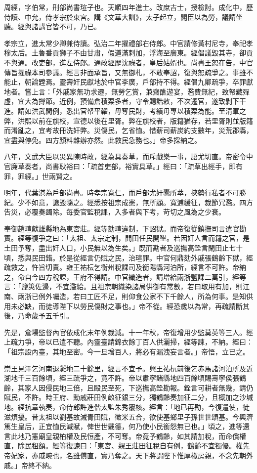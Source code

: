 \begin{pinyinscope}
周經，字伯常，刑部尚書瑄子也。天順四年進士。改庶吉士，授檢討。成化中，歷侍讀、中允，侍孝宗於東宮。講《文華大訓》，太子起立，閣臣以為勞，議請坐聽。經與諸講官皆不可，乃已。

孝宗立，進太常少卿兼侍讀。弘治二年擢禮部右侍郎。中官請修黃村尼寺，奉祀孝穆太后。土魯番貢獅子不由甘肅，假道滿剌加，浮海至廣東。經倡議毀其寺，卻貢不與通。改吏部，進左侍郎。通政經歷沈祿者，皇后姑婿也。尚書王恕在告，中官傳旨擢祿本司參議。經言非面承旨，又無御札，不敢奉詔，復與恕疏爭之。事雖不能止，朝論韙焉。靈壽奸民獻地於中官李廣，戶部持不得。經倡九卿疏爭，卒罪獻地者。嘗上言：「外戚家無功求遷，無勞乞賞，兼齋醮遊宴，濫費無紀，致帑藏殫虛，宜大為撙節。近例，預備倉積粟多者，守令賜誥敕，不次遷官，遂致剝下干進。請如洪武間例，悉出官帑平糴，毋奪民財，考績毋專以積粟為能。至清軍之弊，洪熙以前在旗校，宣德以後在里胥。弊在旗校者，版籍猶存，若里胥則並版籍而淆亂之，宜考故冊洗奸弊。災傷民，乞省恤。惜薪司薪炭約支數年，災荒郡縣，宜盡與停免。四方顏料雜辦亦然。此救民急務也。」帝多採納之。

八年，文武大臣以災異陳時政，經為具奏草，而斥戲樂一事，語尤切直。帝密令中官廉草奏者，尚書耿裕曰：「疏首吏部，裕實具草。」經曰：「疏草出經手，即有罪，罪經。」世兩賢之。

明年，代葉淇為戶部尚書。時孝宗寬仁，而戶部尤奸蠹所萃，挾勢行私者不可勝紀。少不如意，讒毀隨之。經悉按祖宗成憲，無所顧。寬逋緩征，裁節冗濫。四方告災，必覆奏蠲除。每委官監稅課，入多者與下考，苛切之風為之少衰。

奉御趙瑄獻雄縣地為東宮莊。經等劾瑄違制，下詔獄。而帝復從鎮撫司言遣官勘實。經等復爭之曰：「太祖、太宗定制，閒田任民開墾。若因奸人言而籍之官，是土田予奪，盡出奸人口，小民無以為生矣。」既而勘者及巡撫高銓言閑田止七十頃，悉與民田錯。於是從經言仍賦之民，治瑄罪。中官何鼎劾外戚張鶴齡下獄，經疏救之，忤旨切責。雍王祐枟乞衡州稅課司及衡陽縣河泊所，經言不可許。帝納之，命自今四方稅課，王府不得請。中官織造者，請增給兩浙鹽課二萬引，經等言：「鹽筴佐邊，不宜濫給。且祖宗朝織染諸局供御有常數，若曰取用有加，則江南、兩浙已例外囑造，若曰工匠不足，則仰食公家不下千餘人，所為何事。是知供用未必缺，而徒導陛下以勞民傷財之事也。」帝不從。經恐歲以為常，再疏請斷其後，乃命歲予五千引。

先是，倉場監督內官依成化末年例裁減。十一年秋，帝復增用少監莫英等三人。經上疏力爭，帝以已遣不聽。內靈臺請錦衣餘丁百人供灑掃，經等諫，不納。經曰：「祖宗設內臺，其地至密。今一旦增百人，將必有漏洩妄言者。」帝悟，立已之。

崇王見澤乞河南退灘地二十餘里，經言不宜予。興王祐杬前後乞赤馬諸河泊所及近湖地千三百餘頃，經三疏爭之，竟不許。帝以肅寧諸縣地四百餘頃賜壽寧侯張鶴齡，其家人因侵民地三倍，且毆民至死，下巡撫高銓勘報。銓言可耕者無幾，請仍賦民，不許。時王府、勳戚莊田例畝征銀三分，獨鶴齡奏加征二分，且概加之沙堿地。經抗章執奏，命侍郎許進偕太監朱秀覆核。經言：「地已再勘，今復遣使，徒滋煩擾。昔太祖以劉基故減青田賦，徵米五合，欲使基鄉里子孫世世頌基。今興濟篤生皇后，正宜恤民減賦，俾世世戴德，何乃使小民銜怨無已也。」頃之，進等還言此地乃憲廟皇親柏權及民恒產，不可奪。帝竟予鶴齡，如其請加稅，而命償權直，除民租額。經等復諫曰：「東宮、親王莊田征稅自有例，鶴齡不宜獨優。權先帝妃家，亦戚畹也，名雖償直，實乃奪之。天下將謂陛下惟厚椒房親，不念先朝外戚。」帝終不納。


\end{pinyinscope}
